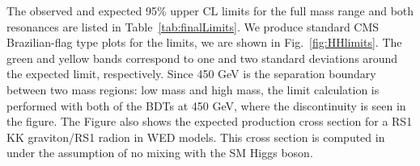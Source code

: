 The observed and expected 95\% upper CL limits for the full mass range
and both resonances are listed in Table~\ref{tab:finalLimits}. We produce standard CMS Brazilian-flag type plots for the limits, we are shown in Fig.~\ref{fig:HHlimits}. The green and yellow
bands correspond to one and two standard deviations around
the expected limit, respectively. Since 450 GeV is the separation boundary between two mass regions: low mass and high mass, the limit calculation is performed with both of the BDTs at 450 GeV, where the discontinuity is
seen in the figure. The Figure also shows the expected production
cross section for a RS1 KK graviton/RS1 radion in WED models. %
This cross section is computed in \cite{Oliveira:2014kla}
under the assumption of no mixing with the SM Higgs boson.











